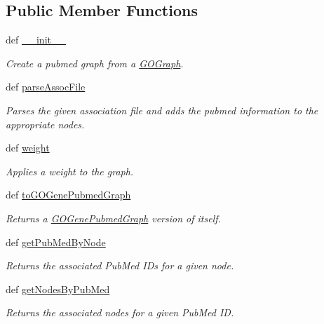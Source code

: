 \subsection*{Public Member Functions}
\begin{DoxyCompactItemize}
\item 
def \hyperlink{class_g_o_pubmed_graph_1_1_g_o_pubmed_graph_a67014838ca4e64ab6302e109cfb38baa}{\_\-\_\-init\_\-\_\-}
\begin{DoxyCompactList}\small\item\em Create a pubmed graph from a \hyperlink{namespace_g_o_graph}{GOGraph}. \item\end{DoxyCompactList}\item 
def \hyperlink{class_g_o_pubmed_graph_1_1_g_o_pubmed_graph_ae6b091d89d8aea816c9b87ca9bff96fb}{parseAssocFile}
\begin{DoxyCompactList}\small\item\em Parses the given association file and adds the pubmed information to the appropriate nodes. \item\end{DoxyCompactList}\item 
def \hyperlink{class_g_o_pubmed_graph_1_1_g_o_pubmed_graph_a1cd7af1343cfc3228db50e62ad1d79be}{weight}
\begin{DoxyCompactList}\small\item\em Applies a weight to the graph. \item\end{DoxyCompactList}\item 
def \hyperlink{class_g_o_pubmed_graph_1_1_g_o_pubmed_graph_a9c455a5443e6be4986d7bfbc1ef874c2}{toGOGenePubmedGraph}
\begin{DoxyCompactList}\small\item\em Returns a \hyperlink{namespace_g_o_gene_pubmed_graph}{GOGenePubmedGraph} version of itself. \item\end{DoxyCompactList}\item 
def \hyperlink{class_g_o_pubmed_graph_1_1_g_o_pubmed_graph_a24635a63eda34340ec00919adc165c7c}{getPubMedByNode}
\begin{DoxyCompactList}\small\item\em Returns the associated PubMed IDs for a given node. \item\end{DoxyCompactList}\item 
def \hyperlink{class_g_o_pubmed_graph_1_1_g_o_pubmed_graph_adc36d3c96e860a9db0dee1e60f0f9345}{getNodesByPubMed}
\begin{DoxyCompactList}\small\item\em Returns the associated nodes for a given PubMed ID. \item\end{DoxyCompactList}\end{DoxyCompactItemize}

